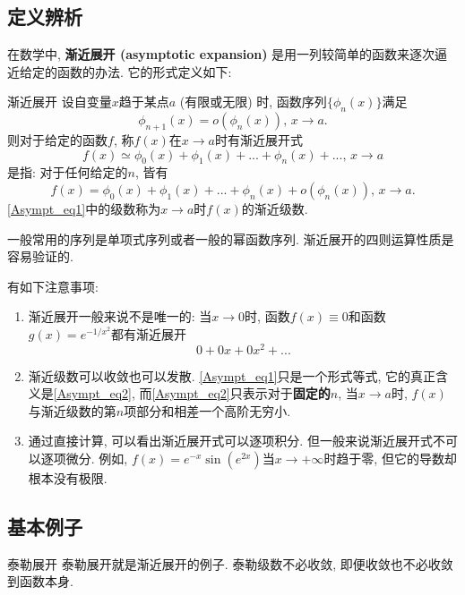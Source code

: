 
\subsection{定义辨析}
在数学中, \textbf{渐近展开 (asymptotic expansion)} 是用一列较简单的函数来逐次逼近给定的函数的办法. 它的形式定义如下:

\begin{definition}{渐近展开}
设自变量$x$趋于某点$a$ (有限或无限) 时, 函数序列$\{\phi_{n}(x)\}$满足
$$
\phi_{n+1}(x)=o(\phi_n(x)),\,x\to a.
$$
则对于给定的函数$f$, 称$f(x)$在$x\to a$时有渐近展开式
\begin{equation}\label{Asympt_eq1}
f(x)\simeq\phi_0(x)+\phi_1(x)+...+\phi_n(x)+...,\,x\to a
\end{equation}
是指: 对于任何给定的$n$, 皆有
\begin{equation}\label{Asympt_eq2}
f(x)=\phi_0(x)+\phi_1(x)+...+\phi_n(x)+o(\phi_n(x)),\,x\to a.
\end{equation}
\autoref{Asympt_eq1}中的级数称为$x\to a$时$f(x)$的渐近级数.
\end{definition}

一般常用的序列是单项式序列或者一般的幂函数序列. 渐近展开的四则运算性质是容易验证的.

有如下注意事项:
\begin{enumerate}
\item 渐近展开一般来说不是唯一的: 当$x\to0$时, 函数$f(x)\equiv 0$和函数$g(x)=e^{-1/x^2}$都有渐近展开
$$
0+0x+0x^2+...
$$

\item 渐近级数可以收敛也可以发散. \autoref{Asympt_eq1}只是一个形式等式, 它的真正含义是\autoref{Asympt_eq2}, 而\autoref{Asympt_eq2}只表示对于\textbf{固定的$n$}, 当$x\to a$时, $f(x)$与渐近级数的第$n$项部分和相差一个高阶无穷小. 

\item 通过直接计算, 可以看出渐近展开式可以逐项积分. 但一般来说渐近展开式不可以逐项微分. 例如, $f(x)=e^{-x}\sin(e^{2x})$当$x\to+\infty$时趋于零, 但它的导数却根本没有极限.
\end{enumerate}

\subsection{基本例子}
\begin{example}{泰勒展开}
泰勒展开就是渐近展开的例子. 泰勒级数不必收敛, 即便收敛也不必收敛到函数本身.
\end{example}

